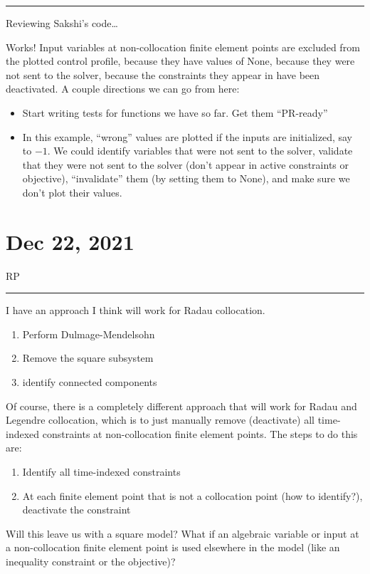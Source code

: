 \documentclass{article}
\newcommand{\RP}{RP\vspace{0.1cm}\hrule\vspace{0.2cm}}
\begin{document}
\vspace{0.5cm}\hrule\vspace{0.5cm}

Reviewing Sakshi's code\dots

Works! Input variables at non-collocation finite element points are excluded
from the plotted control profile, because they have values of None, because
they were not sent to the solver, because the constraints they appear in
have been deactivated.
A couple directions we can go from here:
\begin{itemize}
  \item Start writing tests for functions we have so far. Get them
    ``PR-ready''
  \item In this example, ``wrong'' values are plotted if the inputs are
    initialized, say to $-1$. We could identify variables that were not
    sent to the solver, validate that they were not sent to the solver
    (don't appear in active constraints or objective), ``invalidate'' them
    (by setting them to None), and make sure we don't plot their values.
\end{itemize}

\section{Dec 22, 2021}
\RP
I have an approach I think will work for Radau collocation.
\begin{enumerate}
  \item Perform Dulmage-Mendelsohn
  \item Remove the square subsystem
  \item identify connected components
\end{enumerate}
Of course, there is a completely different approach that will work
for Radau and Legendre collocation, which is to just manually remove
(deactivate) all time-indexed constraints at non-collocation finite
element points.
The steps to do this are:
\begin{enumerate}
  \item Identify all time-indexed constraints
  \item At each finite element point that is not a collocation point
    (how to identify?), deactivate the constraint
\end{enumerate}
Will this leave us with a square model? What if an algebraic variable or
input at a non-collocation finite element point is used elsewhere in the
model (like an inequality constraint or the objective)?
\end{document}
